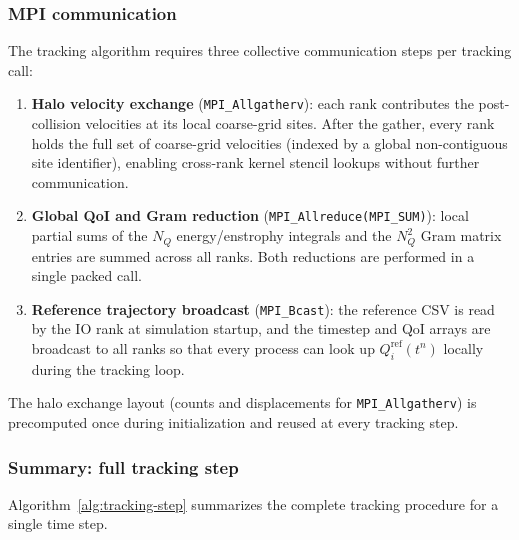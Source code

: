 \documentclass[]{elsarticle}
\begin{document}
\subsubsection{MPI communication}

The tracking algorithm requires three collective communication steps per tracking call:

\begin{enumerate}
    \item \textbf{Halo velocity exchange} (\texttt{MPI\_Allgatherv}): each rank contributes the post-collision velocities at its local coarse-grid sites. After the gather, every rank holds the full set of coarse-grid velocities (indexed by a global non-contiguous site identifier), enabling cross-rank kernel stencil lookups without further communication.

    \item \textbf{Global QoI and Gram reduction} (\texttt{MPI\_Allreduce(MPI\_SUM)}): local partial sums of the $N_Q$ energy/enstrophy integrals and the $N_Q^2$ Gram matrix entries are summed across all ranks. Both reductions are performed in a single packed call.

    \item \textbf{Reference trajectory broadcast} (\texttt{MPI\_Bcast}): the reference CSV is read by the IO rank at simulation startup, and the timestep and QoI arrays are broadcast to all ranks so that every process can look up $Q_i^{\mathrm{ref}}(t^n)$ locally during the tracking loop.
\end{enumerate}

The halo exchange layout (counts and displacements for \texttt{MPI\_Allgatherv}) is precomputed once during initialization and reused at every tracking step.

\subsubsection{Summary: full tracking step}

Algorithm~\ref{alg:tracking-step} summarizes the complete tracking procedure for a single time step.
\end{document}
